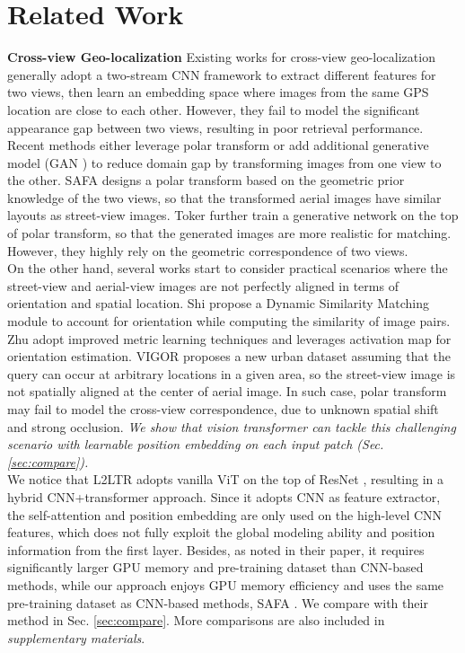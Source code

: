 \documentclass[10pt,twocolumn,letterpaper]{article}
\begin{document}
\section{Related Work}
\noindent\textbf{Cross-view Geo-localization} Existing works for cross-view geo-localization \cite{lin2013cross,workman2015wide, Vo, Chen, CVM, liu2019lending, reweight} generally adopt a two-stream CNN framework to extract different features for two views, then learn an embedding space where images from the same GPS location are close to each other. However, they fail to model the significant appearance gap between two views, resulting in poor retrieval performance. Recent methods either leverage polar transform \cite{SAFA,shi2020looking,toker2021coming} or add additional generative model \cite{UCF,toker2021coming} (GAN \cite{goodfellow2014generative}) to reduce domain gap by transforming images from one view to the other. SAFA \cite{SAFA} designs a polar transform based on the geometric prior knowledge of the two views, so that the transformed aerial images have similar layouts as street-view images. Toker \etal \cite{toker2021coming} further train a generative network on the top of polar transform, so that the generated images are more realistic for matching. However, they highly rely on the geometric correspondence of two views.\\
\indent On the other hand, several works start to consider practical scenarios where the street-view and aerial-view images are not perfectly aligned in terms of orientation and spatial location. Shi \etal \cite{shi2020looking} propose a Dynamic Similarity Matching module to account for orientation while computing the similarity of image pairs. Zhu \etal \cite{WACV} adopt improved metric learning techniques and leverages activation map for orientation estimation. VIGOR \cite{zhu2021vigor} proposes a new urban dataset assuming that the query can occur at arbitrary locations in a given area, so the street-view image is not spatially aligned at the center of aerial image. In such case, polar transform may fail to model the cross-view correspondence, due to unknown spatial shift and strong occlusion. \emph{We show that vision transformer can tackle this challenging scenario with learnable position embedding on each input patch (Sec. \ref{sec:compare}).}\\ 
\indent We notice that L2LTR \cite{yang2021cross} adopts vanilla ViT \cite{vit} on the top of ResNet \cite{he2016deep}, resulting in a hybrid CNN+transformer approach. Since it adopts CNN as feature extractor, the self-attention and position embedding are only used on the high-level CNN features, which does not fully exploit the global modeling ability and position information from the first layer. Besides, as noted in their paper, it requires significantly larger GPU memory \cite{yang2021cross} and pre-training dataset than CNN-based methods, while our approach enjoys GPU memory efficiency and uses the same pre-training dataset as CNN-based methods, \eg SAFA \cite{SAFA}. We compare with their method in Sec. \ref{sec:compare}. More comparisons are also included in \textit{supplementary materials}. \\
\end{document}
